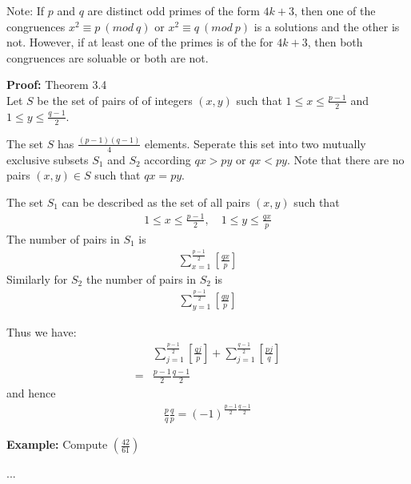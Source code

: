\documentclass[a4paper]{article}
\begin{document}
Note: If $p$ and $q$ are distinct odd primes of the form $4k+3$, then one of
the congruences $x^2\equiv p\ (mod\ q)$ or $x^2\equiv q\ (mod\ p)$
is a solutions and the other is not.
However, if at least one of the primes is of the for $4k+3$, then both
congruences are soluable or both are not.

\textbf{Proof:} Theorem 3.4\\
Let $S$ be the set of pairs of of integers $(x,y)$ such that $1\leq x\leq\frac{p-1}{2}$
and $1\leq y\leq\frac{q-1}{2}$.

The set $S$ has $\frac{(p-1)(q-1)}{4}$ elements. Seperate this set into two mutually
exclusive subsets $S_1$ and $S_2$ according $qx>py$ or $qx<py$.
Note that there are no pairs $(x,y)\in S$ such that $qx=py$.

The set $S_1$ can be described as the set of all pairs $(x,y)$ such that
\begin{align}
    1\leq x\leq\frac{p-1}{2},\quad 1\leq y\leq\frac{qx}{p}
\end{align}
The number of pairs in $S_1$ is
\begin{align}
    \sum^\frac{p-1}{2}_{x=1}[\frac{qx}{p}]
\end{align}
Similarly for $S_2$ the number of pairs in $S_2$ is
\begin{align}
    \sum^\frac{p-1}{2}_{y=1}[\frac{qy}{p}]
\end{align}

Thus we have:
\begin{align}
     &\sum^{\frac{p-1}{2}}_{j=1}[\frac{qj}{p}]+\sum^{\frac{q-1}{2}}_{j=1}[\frac{pj}{q}]\\
    =&\frac{p-1}{2}\frac{q-1}{2}
\end{align}
and hence
\begin{align}
    \frac{p}{q}\frac{q}{p}=(-1)^{\frac{p-1}{2}\frac{q-1}{2}}
\end{align}

\textbf{Example:} Compute $(\frac{42}{61})$

...
\end{document}
